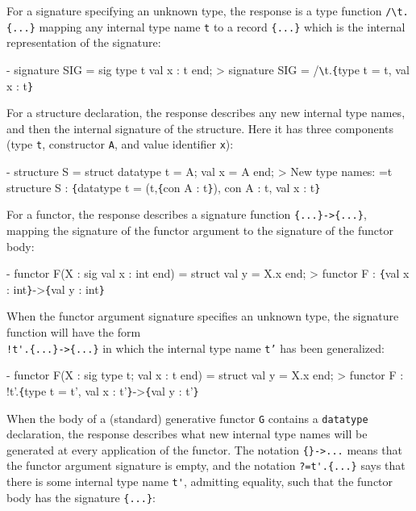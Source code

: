 \documentclass[fleqn,a4paper]{article}
\begin{document}
\noindent 
For a signature specifying an unknown type, the response is a type
function \verb+/\t.{...}+ mapping any internal type name \texttt{t} to
a record \verb+{...}+ which is the internal representation of the
signature:

\begin{program}
- signature SIG = sig type t val x : t end;
> signature SIG = /\verb+\+t.\verb+{+type t = t, val x : t\verb+}+
\end{program}

\noindent 
For a structure declaration, the response describes any new internal
type names, and then the internal signature of the structure.  Here it
has three components (type \texttt{t}, constructor \texttt{A}, and
value identifier \texttt{x}):

\begin{program}
- structure S = struct datatype t = A; val x = A end;
> New type names: =t
  structure S : \verb+{+datatype t = (t,\verb+{+con A : t\verb+}+), con A : t, val x : t\verb+}+
\end{program}

\noindent 
For a functor, the response describes a signature function
\verb+{...}->{...}+, mapping the signature of the functor argument to
the signature of the functor body:

\begin{program}
- functor F(X : sig val x : int end) = struct val y = X.x end;
> functor F : \verb+{+val x : int\verb+}+->\verb+{+val y : int\verb+}+
\end{program}

\noindent When the functor argument signature specifies an unknown
type, the signature function will have the form\\ \verb+!t'.{...}->{...}+
in which the internal type name \texttt{t'} has been generalized:

\begin{program}
- functor F(X : sig type t; val x : t end) = struct val y = X.x end;
> functor F : !t'.\verb+{+type t = t', val x : t'\verb+}+->\verb+{+val y : t'\verb+}+
\end{program}

\noindent When the body of a (standard) generative functor \texttt{G}
contains a \texttt{datatype} declaration, the response describes what
new internal type names will be generated at every application of the
functor.  The notation \verb+{}->...+ means that the functor argument
signature is empty, and the notation \verb+?=t'.{...}+ says that there
is some internal type name \verb+t'+, admitting equality, such that
the functor body has the signature \verb+{...}+:
\end{document}
